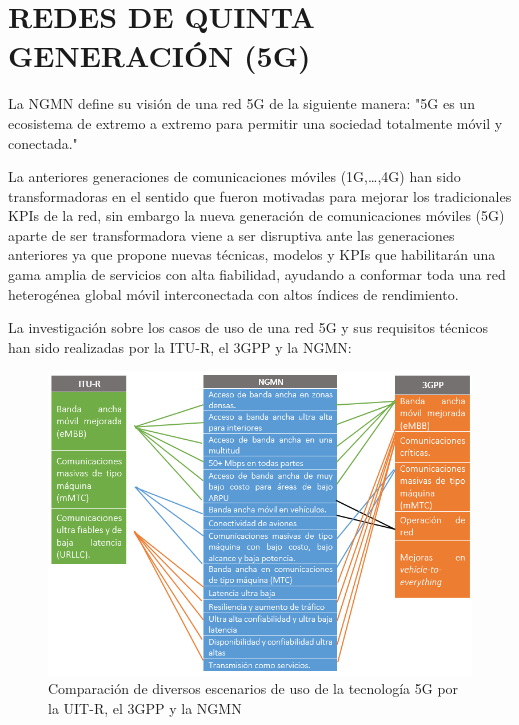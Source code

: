 
\section{REDES DE QUINTA GENERACIÓN (5G)}

La NGMN define su visión de una red 5G de la siguiente manera: "5G es un ecosistema de extremo a extremo para permitir una sociedad totalmente móvil y conectada."\newline

La anteriores generaciones de comunicaciones móviles (1G,{\dots},4G) han sido transformadoras en el sentido que fueron motivadas para mejorar los tradicionales KPIs de la red, sin embargo la nueva generación de comunicaciones móviles (5G) aparte de ser transformadora viene a ser disruptiva ante las generaciones anteriores ya que propone nuevas técnicas, modelos y KPIs que habilitarán una gama amplia de servicios con alta fiabilidad, ayudando a conformar toda una red heterogénea global móvil interconectada con altos índices de rendimiento.\newline

La investigación sobre los casos de uso de una red 5G y sus requisitos técnicos han sido realizadas por la ITU-R, el 3GPP y la NGMN:

\begin{figure}[th]
\centering
\includegraphics[scale=1]{Figures/Comparación de diversos escenarios de uso de la tecnología 5G}
\decoRule
\caption[Comparación de diversos escenarios de uso de la tecnología 5G por la UIT-R, el 3GPP y la NGMN]{Comparación de diversos escenarios de uso de la tecnología 5G por la UIT-R, el 3GPP y la NGMN}
\label{fig:5g}
\end{figure}

